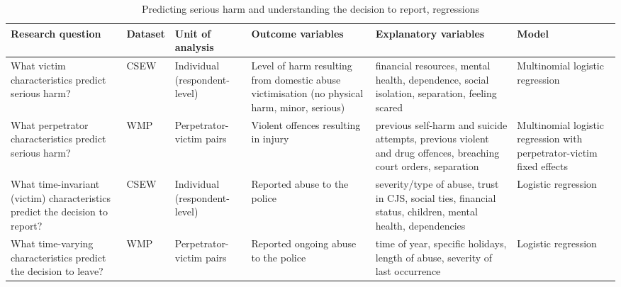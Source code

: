 \documentclass[11pt, a4paper]{article}
\begin{document}
\begin{table}[!htbp]
\caption{Predicting serious harm and understanding the decision to report, regressions}
  \begin{threeparttable}[t]
  \centering
       \begin{tabular}{ L{2.8cm}  C{1.8cm}  C{1.8cm}  C{3.2cm}  C{2.8cm}  C{2cm} }
    \toprule
     \textbf{Research question} & \textbf{Dataset}    & \textbf{Unit of analysis} & \textbf{Outcome variables} & \textbf{Explanatory variables} & \textbf{Model} \\
    \midrule
    What victim characteristics predict serious harm? & CSEW & Individual (respondent-level) & Level of harm resulting from domestic abuse victimisation (no physical harm, minor, serious) & financial resources, mental health, dependence, social isolation, separation, feeling scared & Multinomial logistic regression \\
                \midrule
                    What perpetrator characteristics predict serious harm? & WMP & Perpetrator-victim pairs & Violent offences resulting in injury & previous self-harm and suicide attempts, previous violent and drug offences, breaching court orders, separation & Multinomial logistic regression with perpetrator-victim fixed effects \\
                \midrule
     What time-invariant (victim) characteristics predict the decision to report? & CSEW & Individual (respondent-level) & Reported abuse to the police & severity/type of abuse, trust in CJS, social ties, financial status, children, mental health, dependencies & Logistic regression \\
       \midrule
          What time-varying characteristics predict the decision to leave? & WMP & Perpetrator-victim pairs & Reported ongoing abuse to the police & time of year, specific holidays, length of abuse, severity of last occurrence & Logistic regression \\
     \bottomrule
  \end{tabular}
    \end{threeparttable}%
  \label{tab:addlabel}%
\end{table}%


\end{document}
